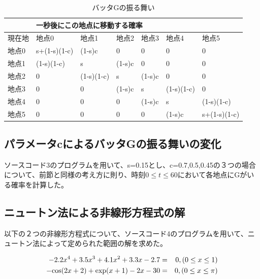 \documentclass[11pt]{ltjsarticle}
\begin{document}
    \begin{table}[]
        \centering
        \begin{tabular}{|l|l|l|l|l|l|l|}
        \hline
        	& \multicolumn{6}{l|}{一秒後にこの地点に移動する確率}                                    \\ \hline
        	現在地 & 地点0          & 地点1        & 地点2    & 地点3    & 地点4        & 地点5          \\ \hline
        	地点0 & s+(1-s)(1-c) & (1-s)c     & 0      & 0      & 0          & 0            \\ \hline
        	地点1 & (1-s)(1-c)   & s          & (1-s)c & 0      & 0          & 0            \\ \hline
        	地点2 & 0            & (1-s)(1-c) & s      & (1-s)c & 0          & 0            \\ \hline
        	地点3 & 0            & 0          & (1-s)c & s      & (1-s)(1-c) & 0            \\ \hline
        	地点4 & 0            & 0          & 0      & (1-s)c & s          & (1-s)(1-c)   \\ \hline
        	地点5 & 0            & 0          & 0      & 0      & (1-s)c     & s+(1-s)(1-c) \\ \hline
        \end{tabular}
        \caption{バッタGの振る舞い}
    \end{table}

\subsection{パラメータcによるバッタGの振る舞いの変化}
	ソースコード3のプログラムを用いて、s=0.15とし、c=0.7,0.5,0.45の３つの場合について、前節と同様の考え方に則り、時刻$0 \leq t \leq 60$において各地点にGがいる確率を計算した。

\subsection{ニュートン法による非線形方程式の解}

	以下の２つの非線形方程式について、ソースコード4のプログラムを用いて、ニュートン法によって定められた範囲の解を求めた。

	\begin{eqnarray}
       - 2.2 x^4 + 3.5x^3 + 4.1x^2 + 3.3x - 2.7 & = & 0, (0 \leq x \leq 1) \\
       - {\rm cos}(2x+2) + {\rm exp}(x+1) - 2x -30 & = & 0, (0 \leq x \leq \pi)
	\end{eqnarray}
	
\end{document}

